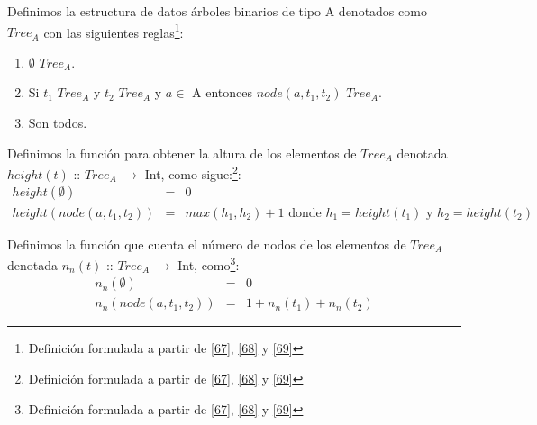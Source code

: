    \begin{definition}
        Definimos la estructura de datos árboles binarios de tipo A denotados como $Tree_{A}$ con las siguientes reglas\footnote{Definición formulada a partir de \hyperlink{67}{[67]}, \hyperlink{68}{[68]} y \hyperlink{69}{[69]}}:

        \begin{enumerate}
            \item $\emptyset$ $Tree_{A}$.
            \item Si  $t_1$ $Tree_{A}$ y $t_2$ $Tree_{A}$ y $a \in $ A  entonces  $node(a,t_1,t_2)$ $Tree_{A}$.
            \item Son todos.
        \end{enumerate} 


    \end{definition}

  \begin{definition}
        Definimos la función para obtener la altura de los elementos de $Tree_{A}$ denotada $height(t)$ :: $Tree_{A}$ $\rightarrow$ Int,  como sigue:\footnote{Definición formulada a partir de \hyperlink{67}{[67]}, \hyperlink{68}{[68]} y \hyperlink{69}{[69]}}:
       \[
            \begin{array}{rcl}
            	height(\emptyset) & = & 0 \\
           	height(node(a,t_1,t_2)) & = & max(h_1,h_2) + 1 \text{ donde } h_1 = height(t_1) \text{ y } h_2 = height(t_2)
         \end{array}
        \]
    \end{definition}
  
    \begin{definition}
        Definimos la función que cuenta el número de nodos de los elementos de $Tree_{A}$ denotada $n_n(t)$ :: $Tree_{A}$ $\rightarrow$ Int,  como\footnote{Definición formulada a partir de \hyperlink{67}{[67]}, \hyperlink{68}{[68]} y \hyperlink{69}{[69]}}:
        \[
            \begin{array}{rcl}
                 n_n(\emptyset)     &  =  & 0  \\
                 n_n(node(a,t_1,t_2))&  =  &1+ n_n(t_1)+n_n(t_2) 
            \end{array}
        \]

    \end{definition}


